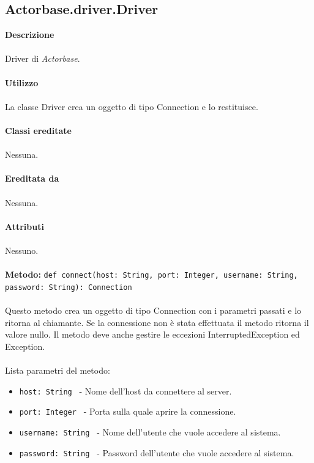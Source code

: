 \documentclass[a4paper]{article}
\begin{document}
	\subsection{Actorbase.driver.Driver}	
		\textbf{Descrizione}
			\\ \\
			Driver di \emph{Actorbase}.
			\\ \\
		\textbf{Utilizzo}
			\\ \\
			La classe Driver crea un oggetto di tipo Connection e lo restituisce.
			\\ \\
		\textbf{Classi ereditate}
			\\ \\
			Nessuna.
			\\ \\
		\textbf{Ereditata da}
			\\ \\
			Nessuna.
			\\ \\
		\textbf{Attributi}
			\\ \\
			Nessuno.
			\\ \\
		\textbf{Metodo: }\texttt{def connect(host: String, port: Integer, username: String, password: String): Connection}
			\\ \\
			Questo metodo crea un oggetto di tipo Connection con i parametri passati e lo ritorna al chiamante. Se la connessione non è stata effettuata il metodo ritorna il valore nullo.
			Il metodo deve anche gestire le eccezioni InterruptedException ed Exception.
			\\ \\
			Lista parametri del metodo:
			\begin{itemize}
				\item \texttt{host: String } - Nome dell'host da connettere al server.
				\item \texttt{port: Integer } - Porta sulla quale aprire la connessione.
				\item \texttt{username: String } - Nome dell'utente che vuole accedere al sistema.
				\item \texttt{password: String } - Password dell'utente che vuole accedere al sistema.
			\end{itemize}
			
\end{document}
